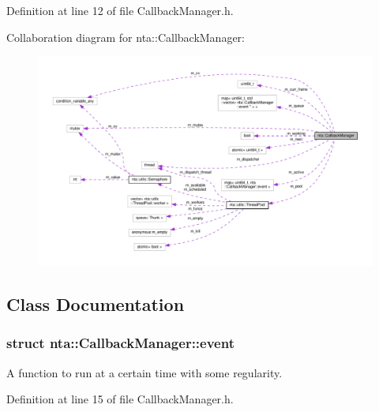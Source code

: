 Definition at line 12 of file Callback\+Manager.\+h.



Collaboration diagram for nta\+:\+:Callback\+Manager\+:
\nopagebreak
\begin{figure}[H]
\begin{center}
\leavevmode
\includegraphics[width=350pt]{dc/df2/classnta_1_1CallbackManager__coll__graph}
\end{center}
\end{figure}


\subsection{Class Documentation}
\label{structnta_1_1CallbackManager_1_1event}
\subsubsection{struct nta\+:\+:Callback\+Manager\+:\+:event}
A function to run at a certain time with some regularity. 

Definition at line 15 of file Callback\+Manager.\+h.



